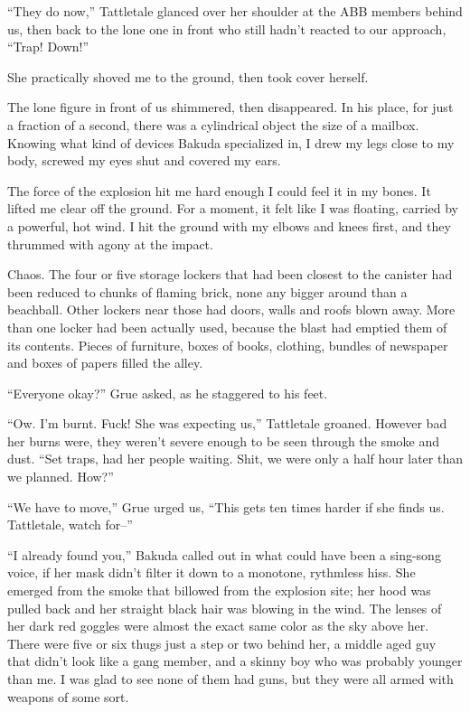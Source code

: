 ``They do now,'' Tattletale glanced over her shoulder at the ABB members behind us, then back to the lone one in front who still hadn't reacted to our approach, ``Trap!  Down!''



She practically shoved me to the ground, then took cover herself.



The lone figure in front of us shimmered, then disappeared.  In his place, for just a fraction of a second, there was a cylindrical object the size of a mailbox.  Knowing what kind of devices Bakuda specialized in, I drew my legs close to my body, screwed my eyes shut and covered my ears.



The force of the explosion hit me hard enough I could feel it in my bones.  It  lifted me clear off the ground.  For a moment, it felt like I was floating, carried by a powerful, hot wind.  I hit the ground with my elbows and knees first, and they thrummed with agony at the impact.



Chaos.  The four or five storage lockers that had been closest to the canister had been  reduced to chunks of flaming brick, none any bigger around than a beachball.  Other lockers near those had doors, walls and roofs blown away.  More than one locker had been actually used, because the blast had emptied them of its contents.  Pieces of furniture, boxes of books, clothing, bundles of newspaper and boxes of papers filled the alley.



``Everyone okay?'' Grue asked, as he staggered to his feet.



``Ow.  I'm burnt.  Fuck!  She was expecting us,'' Tattletale groaned.  However bad her burns were, they weren't severe enough to be seen through the smoke and dust. ``Set traps, had her people waiting.  Shit, we were only a half hour later than we planned.  How?''



``We have to move,'' Grue urged us, ``This gets ten times harder if she finds us.  Tattletale, watch for--''



``I already found you,'' Bakuda called out in what could have been a sing-song voice, if her mask didn't filter it down to a monotone, rythmless hiss.  She emerged from the smoke that billowed from the explosion site; her hood was pulled back and her straight black hair was blowing in the wind.  The lenses of her dark red goggles were almost the exact same color as the sky above her.  There were five or six thugs just a step or two behind her, a middle aged guy that didn't look like a gang member, and a skinny boy who was probably younger than me.  I was glad to see none of them had guns, but they were all armed with weapons of some sort.



